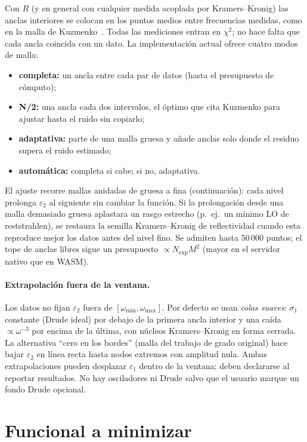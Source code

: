 Con $R$ (y en general con cualquier medida acoplada por Kramers--Kronig) las anclas interiores se colocan en los puntos medios entre frecuencias medidas, como en la malla de Kuzmenko~\cite{constrained}.
Todas las mediciones entran en $\chi^{2}$; no hace falta que cada ancla coincida con un dato.
La implementaci\'on actual ofrece cuatro modos de malla:
\begin{itemize}[leftmargin=*]
\item \textbf{completa:} un ancla entre cada par de datos (hasta el presupuesto de c\'omputo);
\item \textbf{N/2:} una ancla cada dos intervalos, el \'optimo que cita Kuzmenko para ajustar hasta el ruido sin copiarlo;
\item \textbf{adaptativa:} parte de una malla gruesa y a\~nade anclas solo donde el residuo supera el ruido estimado;
\item \textbf{autom\'atica:} completa si cabe; si no, adaptativa.
\end{itemize}
El ajuste recorre mallas anidadas de gruesa a fina (continuaci\'on): cada nivel prolonga $\varepsilon_2$ al siguiente sin cambiar la funci\'on.
Si la prolongaci\'on desde una malla demasiado gruesa aplastara un rasgo estrecho (p.\ ej.\ un m\'inimo LO de reststrahlen), se restaura la semilla Kramers--Kronig de reflectividad cuando esta reproduce mejor los datos antes del nivel fino.
Se admiten hasta $50\,000$ puntos; el tope de anclas libres sigue un presupuesto $\propto N_{\mathrm{exp}}M^{2}$ (mayor en el servidor nativo que en WASM).

\paragraph{Extrapolaci\'on fuera de la ventana.}
Los datos no fijan $\varepsilon_2$ fuera de $[\omega_{\min},\omega_{\max}]$.
Por defecto se usan \emph{colas suaves}: $\sigma_1$ constante (Drude ideal) por debajo de la primera ancla interior y una ca\'ida $\propto\omega^{-3}$ por encima de la \'ultima, con n\'ucleos Kramers--Kronig en forma cerrada.
La alternativa ``cero en los bordes'' (malla del trabajo de grado original) hace bajar $\varepsilon_2$ en l\'inea recta hasta nodos extremos con amplitud nula.
Ambas extrapolaciones pueden desplazar $\varepsilon_1$ dentro de la ventana; deben declararse al reportar resultados.
No hay osciladores ni Drude salvo que el usuario marque un fondo Drude opcional.

\section{Funcional a minimizar}

